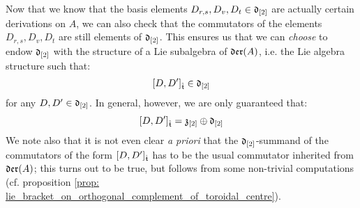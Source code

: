         \begin{remark}
            Now that we know that the basis elements $D_{r, s}, D_v, D_t \in \mathfrak{d}_{[2]}$ are actually certain derivations on $A$, we can also check that the commutators of the elements $D_{r, s}, D_v, D_t$ are still elements of $\mathfrak{d}_{[2]}$. This ensures us that we can \textit{choose} to endow $\mathfrak{d}_{[2]}$ with the structure of a Lie subalgebra of $\mathfrak{der}(A)$, i.e. the Lie algebra structure such that:
                $$[D, D']_{\hat{\mathfrak{t}}} \in \mathfrak{d}_{[2]}$$
            for any $D, D' \in \mathfrak{d}_{[2]}$. In general, however, we are only guaranteed that:
                $$[D, D']_{\hat{\mathfrak{t}}} = \mathfrak{z}_{[2]} \oplus \mathfrak{d}_{[2]}$$
            We note also that it is not even clear \textit{a priori} that the $\mathfrak{d}_{[2]}$-summand of the commutators of the form $[D, D']_{\hat{\mathfrak{t}}}$ has to be the usual commutator inherited from $\mathfrak{der}(A)$; this turns out to be true, but follows from some non-trivial computations (cf. proposition \ref{prop: lie_bracket_on_orthogonal_complement_of_toroidal_centre}). 
        \end{remark}

